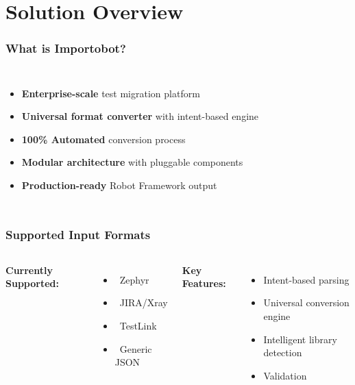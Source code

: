 \section{Solution Overview}
\begin{frame}
\frametitle{What is Importobot?}
\begin{columns}
\begin{itemize}
    \item \textbf{Enterprise-scale} test migration platform
    \item \textbf{Universal format converter} with intent-based engine
    \item \textbf{100\% Automated} conversion process
    \item \textbf{Modular architecture} with pluggable components
    \item \textbf{Production-ready} Robot Framework output
\end{itemize}

\end{columns}
\end{frame}

\begin{frame}
\frametitle{Supported Input Formats}
\begin{columns}
\textbf{Currently Supported:}
{\footnotesize
\begin{itemize}
\raggedright

    \item \faCheckCircle\ Zephyr
    \item \faCheckCircle\ JIRA/Xray
    \item \faCheckCircle\ TestLink
    \item \faCheckCircle\ Generic JSON
\end{itemize}
}

\textbf{Key Features:}
\begin{itemize}
    \item Intent-based parsing
    \item Universal conversion engine
    \item Intelligent library detection
    \item Validation
\end{itemize}
\end{columns}
\end{frame}

